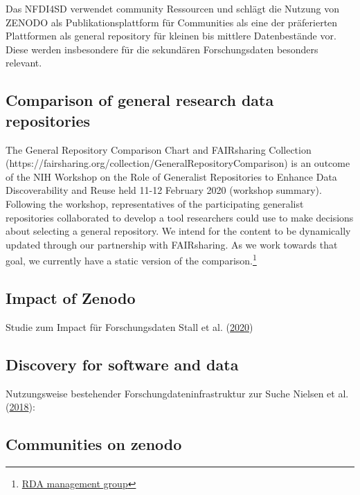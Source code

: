 \documentclass[
  english,
  paper=a4,
  oneside,captions=tableheading
]{scrbook}
\renewenvironment{quote}{\begin{customblockquote}\list{}{\rightmargin=0em\leftmargin=0em}%
\item\relax\color{blockquote-text}\ignorespaces}{\unskip\unskip\endlist\end{customblockquote}}
\begin{document}
Das NFDI4SD verwendet community Ressourcen und schlägt die Nutzung von
ZENODO als Publikationsplattform für Communities als eine der
präferierten Plattformen als general repository für kleinen bis mittlere
Datenbestände vor. Diese werden insbesondere für die sekundären
Forschungsdaten besonders relevant.

\hypertarget{comparison-of-general-research-data-repositories}{%
\subsection{Comparison of general research data
repositories}\label{comparison-of-general-research-data-repositories}}

\begin{quote}
The General Repository Comparison Chart and FAIRsharing Collection
(https://fairsharing.org/collection/GeneralRepositoryComparison) is an
outcome of the NIH Workshop on the Role of Generalist Repositories to
Enhance Data Discoverability and Reuse held 11-12 February 2020
(workshop summary). Following the workshop, representatives of the
participating generalist repositories collaborated to develop a tool
researchers could use to make decisions about selecting a general
repository. We intend for the content to be dynamically updated through
our partnership with FAIRsharing. As we work towards that goal, we
currently have a static version of the comparison.\footnote{\href{https://www.rd-alliance.org/groups/generalist-repository-comparison-chart-management-group}{RDA
  management group}}
\end{quote}

\hypertarget{impact-of-zenodo}{%
\subsection{Impact of Zenodo}\label{impact-of-zenodo}}

Studie zum Impact für Forschungsdaten Stall et al.
(\protect\hyperlink{ref-stall2020a}{2020})

\hypertarget{discovery-for-software-and-data}{%
\subsection{Discovery for software and
data}\label{discovery-for-software-and-data}}

Nutzungsweise bestehender Forschungdateninfrastruktur zur Suche Nielsen
et al. (\protect\hyperlink{ref-nielsen2018}{2018}):

\hypertarget{communities-on-zenodo}{%
\subsection{Communities on zenodo}\label{communities-on-zenodo}}
\end{document}
